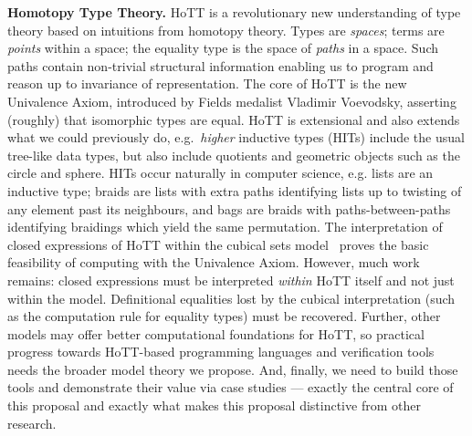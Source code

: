 \documentclass[a4paper,11pt]{article}
\begin{document}
{\bf Homotopy Type Theory.} HoTT is a revolutionary new understanding of
type theory based on intuitions from homotopy theory. Types are
\emph{spaces}; terms are \emph{points} within a space; the equality
type is the space of \emph{paths} in a space. Such paths contain
non-trivial structural information enabling us to program and reason up to invariance of
representation. The core of HoTT is the new Univalence Axiom,
introduced by Fields medalist Vladimir Voevodsky, asserting (roughly)
that isomorphic types are equal. HoTT is extensional and also 
extends what we could previously do, e.g.\
\emph{higher} inductive types (HITs) include the usual tree-like data
types, but also include quotients \cite{alti:mpc04} and geometric
objects such as the circle and sphere. HITs occur naturally in computer
science, e.g. lists are an inductive type; braids are lists with extra
paths identifying lists up to twisting of any element past its
neighbours, and bags are braids with paths-between-paths identifying
braidings which yield the same permutation. 
The interpretation of closed expressions of HoTT within the cubical
sets model~\cite{BezemM:cubsmt, nominal} proves the basic feasibility of computing
with the Univalence Axiom. However, much work remains: closed
expressions  must be interpreted  \emph{within} HoTT itself and 
not just within the model. Definitional equalities lost by the cubical interpretation (such as
the computation rule for equality types) must be recovered. Further, other models may
offer better computational foundations for HoTT, so practical progress
towards HoTT-based programming languages and verification tools needs
the broader model theory we propose. And, finally, we need to build those
tools and demonstrate their value via case studies --- exactly the central core of this
proposal and exactly what makes this proposal
distinctive from other research. 








\end{document}
